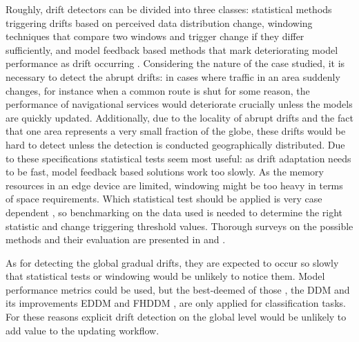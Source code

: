 Roughly, drift detectors can be divided into three classes: statistical methods triggering drifts based on perceived data distribution change, windowing techniques that compare two windows and trigger change if they differ sufficiently, and model feedback based methods that mark deteriorating model performance as drift occurring \cite{faithfullUnsupervisedChangeDetection2018}. Considering the nature of the case studied, it is necessary to detect the abrupt drifts: in cases where traffic in an area suddenly changes, for instance when a common route is shut for some reason, the performance of navigational services would deteriorate crucially unless the models are quickly updated. Additionally, due to the locality of abrupt drifts and the fact that one area represents a very small fraction of the globe, these drifts would be hard to detect unless the detection is conducted geographically distributed. Due to these specifications statistical tests seem most useful: as drift adaptation needs to be fast, model feedback based solutions work too slowly. As the memory resources in an edge device are limited, windowing might be too heavy in terms of space requirements. Which statistical test should be applied is very case dependent \cite{faithfullUnsupervisedChangeDetection2018}, so benchmarking on the data used is needed to determine the right statistic and change triggering threshold values. Thorough surveys on the possible methods and their evaluation are presented in \cite{conceptdriftsurvey} and \cite{faithfullUnsupervisedChangeDetection2018}.

As for detecting the global gradual drifts, they are expected to occur so slowly that statistical tests or windowing would be unlikely to notice them. Model performance metrics could be used, but the best-deemed of those \cite{celikAdaptationStrategiesAutomated2021} \cite{madridAutoMLPresenceDrift2019}, the DDM \cite{gamaLearningDriftDetection2004} and its improvements EDDM \cite{baena-garciaEarlyDriftDetection2006} and FHDDM \cite{pesaranghaderFastHoeffdingDrift2016}, are only applied for classification tasks. For these reasons explicit drift detection on the global level would be unlikely to add value to the updating workflow. 



